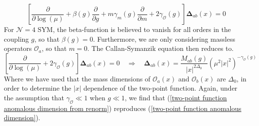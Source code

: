 %
%
\begin{equation}
\left[
\frac{\partial}{\partial \log(\mu)}
+ \beta(g) \frac{\partial}{\partial g}
+ m \gamma_m(g) \frac{\partial}{\partial m}
+ 2 \gamma_{\mathcal{O}}(g) 
\right] \mathbf{\Delta}_{ab}(x)
=
0
\end{equation}
%
%
For $\mathcal{N}=4$ SYM, the beta-function is believed to vanish for all orders in the coupling $g$, so that $\beta(g) = 0$. Furthermore, we are only considering massless operators $\mathcal{O}_a$, so that $m = 0$. The Callan-Symanzik equation then reduces to.
%
%
\begin{equation}\label{two-point function anomalous dimension from renorm}
\left[
\frac{\partial}{\partial \log(\mu)}
+ 2 \gamma_{\mathcal{O}}(g)
\right] \mathbf{\Delta}_{ab}(x)
=
0
%
\quad \Rightarrow \quad
%
\mathbf{\Delta}_{ab}(x)
=
\frac{M_{ab}(g)}{|x|^{2 \Delta_0}}
\left(
\mu^2 |x|^2
\right)^{-\gamma_{\mathcal{O}}(g)}
\end{equation}
%
%
Where we have used that the mass dimensions of $\mathcal{O}_a(x)$ and $\mathcal{O}_b(x)$ are $\Delta_0$, in order to determine the $|x|$ dependence of the two-point function. Again, under the assumption that $\gamma_{\mathcal{O}} \ll 1$ when $g \ll 1$, we find that (\ref{two-point function anomalous dimension from renorm}) reproduces (\ref{two-point function anomalous dimension}).

